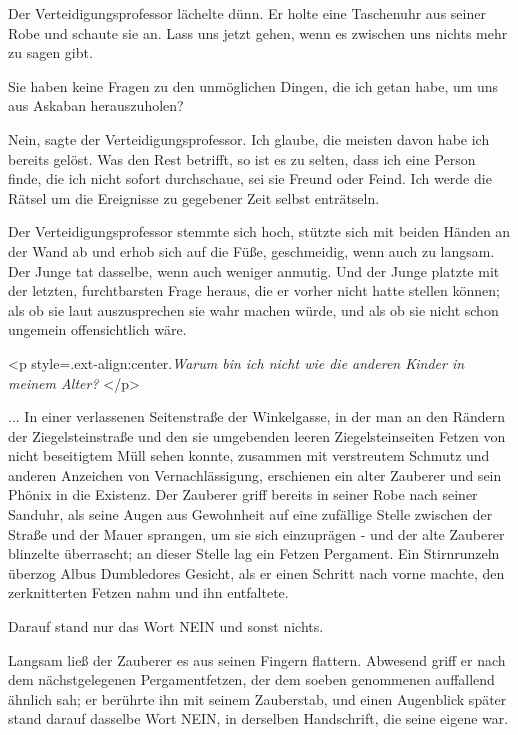 Der Verteidigungsprofessor lächelte dünn. Er holte eine Taschenuhr aus seiner
Robe und schaute sie an. \glqq Lass uns jetzt gehen, wenn es zwischen uns nichts
mehr zu sagen gibt.\grqq{}

\glqq Sie haben keine Fragen zu den unmöglichen Dingen, die ich getan habe, um
uns aus Askaban herauszuholen?\grqq{}

\glqq Nein\grqq{}, sagte der Verteidigungsprofessor. \glqq Ich glaube, die
meisten davon habe ich bereits gelöst. Was den Rest betrifft, so ist es zu
selten, dass ich eine Person finde, die ich nicht sofort durchschaue, sei sie
Freund oder Feind. Ich werde die Rätsel um die Ereignisse zu gegebener Zeit
selbst enträtseln.\grqq{}

Der Verteidigungsprofessor stemmte sich hoch, stützte sich mit beiden Händen an
der Wand ab und erhob sich auf die Füße, geschmeidig, wenn auch zu langsam. Der
Junge tat dasselbe, wenn auch weniger anmutig. Und der Junge platzte mit der
letzten, furchtbarsten Frage heraus, die er vorher nicht hatte stellen können;
als ob sie laut auszusprechen sie wahr machen würde, und als ob sie nicht schon
ungemein offensichtlich wäre.

<p style=\grqq{}.ext-align:center\grqq{}.\emph{\glqq Warum bin ich nicht wie die
anderen Kinder in meinem Alter?\grqq{} }</p>


... In einer verlassenen Seitenstraße der Winkelgasse, in der man an den Rändern
der Ziegelsteinstraße und den sie umgebenden leeren Ziegelsteinseiten Fetzen von
nicht beseitigtem Müll sehen konnte, zusammen mit verstreutem Schmutz und
anderen Anzeichen von Vernachlässigung, erschienen ein alter Zauberer und sein
Phönix in die Existenz. Der Zauberer griff bereits in seiner Robe nach seiner
Sanduhr, als seine Augen aus Gewohnheit auf eine zufällige Stelle zwischen der
Straße und der Mauer sprangen, um sie sich einzuprägen - und der alte Zauberer
blinzelte überrascht; an dieser Stelle lag ein Fetzen Pergament. Ein
Stirnrunzeln überzog Albus Dumbledores Gesicht, als er einen Schritt nach vorne
machte, den zerknitterten Fetzen nahm und ihn entfaltete.

Darauf stand nur das Wort \glqq NEIN\grqq{} und sonst nichts.

Langsam ließ der Zauberer es aus seinen Fingern flattern. Abwesend griff er nach
dem nächstgelegenen Pergamentfetzen, der dem soeben genommenen auffallend
ähnlich sah; er berührte ihn mit seinem Zauberstab, und einen Augenblick später
stand darauf dasselbe Wort \glqq NEIN\grqq{}, in derselben Handschrift, die
seine eigene war.


